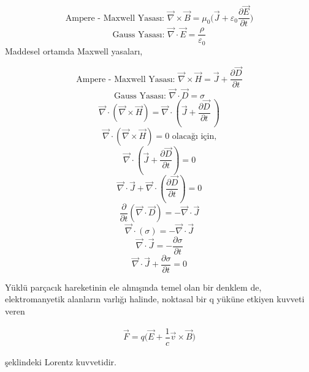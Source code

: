 \begin{definition}

\[  \textrm{Ampere - Maxwell Yasası: } \vec{\nabla} \times \vec{B} = \mu_{0} \bigg( \vec{J} + \varepsilon_{0} \dfrac{\partial \vec{E}}{\partial t}  \bigg) \]
 \[ \textrm{Gauss Yasası: } \vec{\nabla} \cdot \vec{E} = \dfrac{\rho}{\varepsilon_{0}}   \]
Maddesel ortamda Maxwell yasaları,

\[   \textrm{Ampere - Maxwell Yasası: } \vec{\nabla} \times \vec{H} = \vec{J} + \frac{\partial \vec{D}}{\partial t}  \]
\[  \textrm{Gauss Yasası: } \vec{\nabla} \cdot \vec{D} = \sigma  \]
\[ \vec{\nabla} \cdot (\vec{\nabla} \times \vec{H} ) = \vec{\nabla} \cdot (\vec{J} + \dfrac{\partial \vec{D}}{\partial t}\ )  \]	
\[    \vec{\nabla} \cdot ( \vec{\nabla} \times \vec{H} ) = 0 \textrm{ olacağı için,}  \]
\[     \vec{\nabla} \cdot ( \vec{J} + \dfrac{\partial \vec{D}}{\partial t} ) = 0  \]
\[     \vec{\nabla} \cdot \vec{J} + \vec{\nabla} \cdot ( \dfrac{\partial \vec{D}}{\partial t} ) = 0 \]
\[  \dfrac{\partial}{\partial t} ( \vec{\nabla} \cdot \vec{D} ) = - \vec{\nabla} \cdot \vec{J}  \]
\[   \vec{\nabla} \cdot ( \sigma ) = - \vec{\nabla} \cdot \vec{J}  \]
\[  \vec{\nabla} \cdot \vec{J}  = -  \dfrac{\partial \sigma }{\partial t}  \]
\[  \vec{\nabla} \cdot \vec{J} + \dfrac{\partial \sigma }{\partial t}  = 0  \]
	  
\end{definition}

Yüklü parçacık hareketinin ele alınışında temel olan bir denklem de, elektromanyetik alanların varlığı halinde, noktasal bir q yüküne etkiyen kuvveti veren

\begin{align}
    \Vec{F} = q \big( \Vec{E} + \dfrac{1}{c} \Vec{v} \times \Vec{B} \big) 
\end{align}

şeklindeki Lorentz kuvvetidir.

